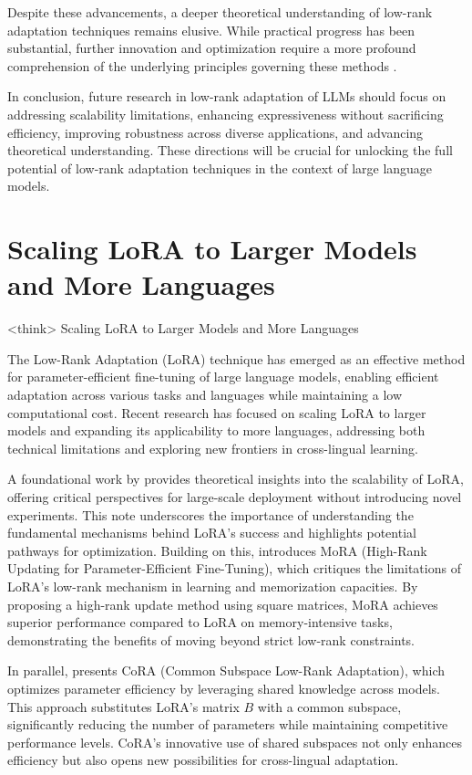 \documentclass[conference]{IEEEtran}
\begin{document}
Despite these advancements, a deeper theoretical understanding of low-rank adaptation techniques remains elusive. While practical progress has been substantial, further innovation and optimization require a more profound comprehension of the underlying principles governing these methods \cite{bX}.

In conclusion, future research in low-rank adaptation of LLMs should focus on addressing scalability limitations, enhancing expressiveness without sacrificing efficiency, improving robustness across diverse applications, and advancing theoretical understanding. These directions will be crucial for unlocking the full potential of low-rank adaptation techniques in the context of large language models.

\section{Scaling LoRA to Larger Models and More Languages}
<think>
Scaling LoRA to Larger Models and More Languages

The Low-Rank Adaptation (LoRA) technique has emerged as an effective method for parameter-efficient fine-tuning of large language models, enabling efficient adaptation across various tasks and languages while maintaining a low computational cost. Recent research has focused on scaling LoRA to larger models and expanding its applicability to more languages, addressing both technical limitations and exploring new frontiers in cross-lingual learning.

A foundational work by \cite{a} provides theoretical insights into the scalability of LoRA, offering critical perspectives for large-scale deployment without introducing novel experiments. This note underscores the importance of understanding the fundamental mechanisms behind LoRA's success and highlights potential pathways for optimization. Building on this, \cite{b} introduces MoRA (High-Rank Updating for Parameter-Efficient Fine-Tuning), which critiques the limitations of LoRA's low-rank mechanism in learning and memorization capacities. By proposing a high-rank update method using square matrices, MoRA achieves superior performance compared to LoRA on memory-intensive tasks, demonstrating the benefits of moving beyond strict low-rank constraints.

In parallel, \cite{c} presents CoRA (Common Subspace Low-Rank Adaptation), which optimizes parameter efficiency by leveraging shared knowledge across models. This approach substitutes LoRA's matrix $B$ with a common subspace, significantly reducing the number of parameters while maintaining competitive performance levels. CoRA's innovative use of shared subspaces not only enhances efficiency but also opens new possibilities for cross-lingual adaptation.
\end{document}
